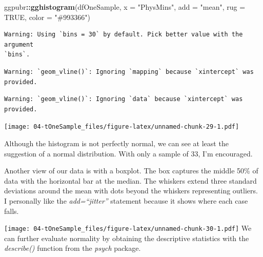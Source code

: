 \documentclass[
  11pt,
]{book}
\newenvironment{Shaded}{\begin{snugshade}}{\end{snugshade}}
\newcommand{\AttributeTok}[1]{\textcolor[rgb]{0.27,0.27,0.27}{#1}}
\newcommand{\ConstantTok}[1]{\textcolor[rgb]{0.37,0.37,0.37}{#1}}
\newcommand{\FunctionTok}[1]{\textcolor[rgb]{0.27,0.27,0.27}{\textbf{#1}}}
\newcommand{\NormalTok}[1]{#1}
\newcommand{\SpecialCharTok}[1]{\textcolor[rgb]{0.43,0.43,0.43}{\textbf{#1}}}
\newcommand{\StringTok}[1]{\textcolor[rgb]{0.5,0.5,0.5}{#1}}
\begin{document}
\begin{Shaded}
\begin{Highlighting}[]
\NormalTok{ggpubr}\SpecialCharTok{::}\FunctionTok{gghistogram}\NormalTok{(dfOneSample, }\AttributeTok{x =} \StringTok{"PhysMins"}\NormalTok{, }\AttributeTok{add =} \StringTok{"mean"}\NormalTok{, }\AttributeTok{rug =} \ConstantTok{TRUE}\NormalTok{,}
    \AttributeTok{color =} \StringTok{"\#993366"}\NormalTok{)}
\end{Highlighting}
\end{Shaded}

\begin{verbatim}
Warning: Using `bins = 30` by default. Pick better value with the argument
`bins`.
\end{verbatim}

\begin{verbatim}
Warning: `geom_vline()`: Ignoring `mapping` because `xintercept` was provided.
\end{verbatim}

\begin{verbatim}
Warning: `geom_vline()`: Ignoring `data` because `xintercept` was provided.
\end{verbatim}

\texttt{[image: 04-tOneSample\_files/figure-latex/unnamed-chunk-29-1.pdf]}

Although the histogram is not perfectly normal, we can see at least the suggestion of a normal distribution. With only a sample of 33, I'm encouraged.

Another view of our data is with a boxplot. The box captures the middle 50\% of data with the horizontal bar at the median. The whiskers extend three standard deviations around the mean with dots beyond the whiskers representing outliers. I personally like the \emph{add=``jitter''} statement because it shows where each case falls.

\begin{Shaded}
\end{Shaded}

\texttt{[image: 04-tOneSample\_files/figure-latex/unnamed-chunk-30-1.pdf]} We can further evaluate normality by obtaining the descriptive statistics with the \emph{describe()} function from the \emph{psych} package.
\end{document}
